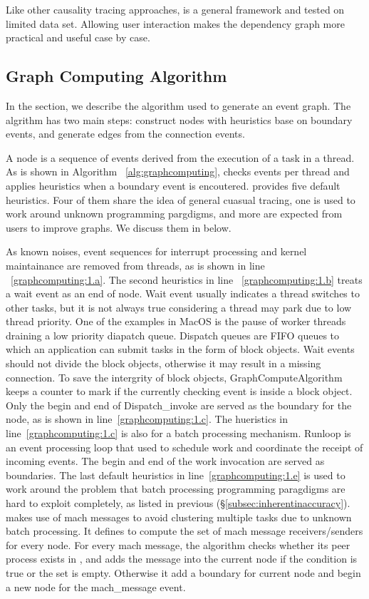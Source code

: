 Like other causality tracing approaches, \xxx is a general framework and tested
on limited data set. Allowing user interaction makes the dependency graph more
practical and useful case by case.

\subsection{Graph Computing Algorithm}

In the section, we describe the algorithm \xxx used to generate an event graph.
The algrithm has two main steps: construct nodes with heuristics base on
boundary events, and generate edges from the connection events.

A node is a sequence of events derived from the execution of a task in a thread.
As is shown in Algorithm ~\ref{alg:graphcomputing}, \xxx checks events per
thread and applies heuristics when a boundary event is encoutered. \xxx provides
five default heuristics. Four of them share the idea of general cuasual tracing, one
is used to work around unknown programming pargdigms, and more are expected
from users to improve graphs. We discuss them in below.

As known noises, event sequences for interrupt processing and
kernel maintainance are removed from threads, as is shown in
line ~\ref{graphcomputing:1.a}. The second heuristics in line
~\ref{graphcomputing:1.b} treats a wait event as an end of node. Wait event
usually indicates a thread switches to other tasks, but it is not always true
considering a thread may park due to low thread priority. One of the examples
in MacOS is the pause of worker threads draining a low priority diapatch queue.
Dispatch queues are FIFO queues to which an application can submit tasks in
the form of block objects. Wait events should not divide the block objects,
otherwise it may result in a missing connection. To save the intergrity of block
objects, \xxx GraphComputeAlgorithm keeps a counter  to mark
if the currently checking event is inside a block object. Only the begin and
end of Dispatch\_invoke are served as the boundary for the node, as is shown in
line~\ref{graphcomputing:1.c}. The hueristics in line~\ref{graphcomputing:1.c}
is also for a batch processing mechanism. Runloop is an event processing loop
that used to schedule work and coordinate the receipt of incoming events. The
begin and end of the work invocation are served as boundaries. The last default
heuristics in line~\ref{graphcomputing:1.e} is used to work around the problem
that batch processing programming paragdigms are hard to exploit completely, as
listed in previous (\S\ref{subsec:inherentinaccuracy}). \xxx makes use of mach
messages to avoid clustering multiple tasks due to unknown batch processing. It
defines  to compute the set of mach message receivers/senders
for every node. For every mach message, the algorithm checks whether its peer
process exists in , and adds the message into the current
node if the condition is true or the set is empty. Otherwise it add a boundary
for current node and begin a new node for the mach\_message event.

